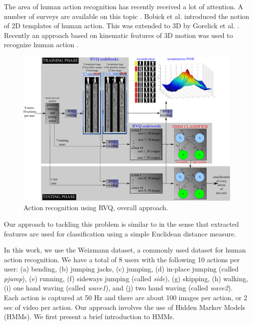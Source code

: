 The area of human action recognition has recently received a lot of attention.  A number of surveys are available on this topic \cite{1995_JNL_SURVEYmotion_Cedras, 1999_JNL_SURVEYmotion_Aggarwal, 1999_JNL_SURVEYmotion_Gavrila, 1999_REP_SURVEYmotion_Moeslund, 2001_JNL_SURVEYmotion_Moeslund, 2003_JNL_SURVEYiu_Buxton, 2003_JNL_SURVEYmotion_LWang, 2003_JNL_SURVEYbeh_Shah,2003_JNL_SURVEYaction_JWang, 2004_CNF_SURVEYaction_Aggarwal, 2004_JNL_SURVEYiu_Hu, 2004_CNF_SURVEYgait_Nixon, 2004_CNF_Survey3DshapeRetrieval, 2006_JNL_HumanMotion_Moeslund, 2007_JNL_HumanMotion_Poppe, 2008_CNF_SurveyHumanActivityRecognition_Ahad, 2010_JNL_SURVEYmotion_Ji}.  Bobick et al. \cite{2001_JNL_MotionTemplates_Bobick} introduced the notion of 2D templates of human action.  This was extended to 3D by Gorelick et al. \cite{2007_JNL_SpaceTimeShapes_Gorelick}.  Recently an approach based on kinematic features of 3D motion was used to recognize human action \cite{2010_JNL_ActionReconKinematic_Ali}.   

								\begin{figure}[t]
								\centering
								\includegraphics[width=1.0\textwidth]{figs/RVQ_HMM_IPCV2010_blockDiagram.pdf}
								\caption{Action recognition using RVQ, overall approach.}
								\label{fig:RVQ_HMM_IPCV2010_blockDiagram}
								\end{figure}


Our approach to tackling this problem is similar to \cite{2007_JNL_SpaceTimeShapes_Gorelick} in the sense that extracted features are used for classification using a simple Euclidean distance measure.  

In this work, we use the Weizmann dataset, a commonly used dataset for human action recognition.  We have a total of 8 users with the following 10 actions per user: (a) bending, (b) jumping jacks, (c) jumping, (d) in-place jumping (called \emph{pjump}), (e) running, (f) sideways jumping (called \emph{side}), (g) skipping, (h) walking, (i) one hand waving (called \emph{wave1}), and (j) two hand waving (called \emph{wave2}).  Each action is captured at 50 Hz and there are about 100 images per action, or 2 sec of video per action.  Our approach involves the use of Hidden Markov Models (HMMs).  We first present a brief introduction to HMMs.

